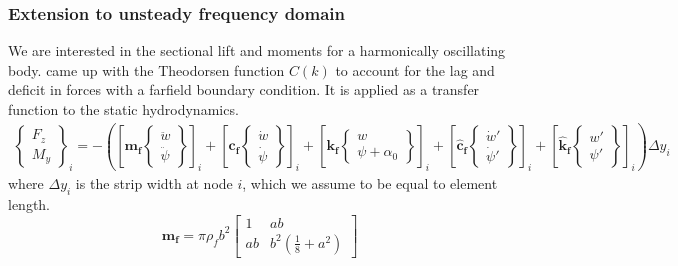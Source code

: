 \documentclass[10pt]{article}
\newcommand{\mbf}[1]{\mathbf{#1}}
\begin{document}
\subsubsection{Extension to unsteady frequency domain}
% 
We are interested in the sectional lift and moments for a harmonically oscillating body.
\citet{Theodorsen:1934} came up with the Theodorsen function $C(k)$ to account for the lag and deficit in forces with a farfield boundary condition.
It is applied as a transfer function to the static hydrodynamics.
\begin{eqnarray}
	\label{eqn:GenFluidTheod}
	\left\{\begin{matrix}
		F_z \\
		M_y
	\end{matrix}\right\}_i =
	-
	\left(
	\left[
		\mbf{m_f}
		\left\{
		\begin{matrix}
			\ddot{w} \\
			\ddot{\psi}
		\end{matrix}
		\right\}
		\right]_i
	+
	\left[
		\mbf{c_f}
		\left\{\begin{matrix}\dot{w} \\ \dot{\psi} \end{matrix}\right\}
		\right]_i
	+
	\left[
		\mbf{k_f}
		\left\{\begin{matrix}w \\ \psi + \alpha_0 \end{matrix}\right\}
		\right]_i
	+
	\left[
		\mbf{\hat{c}_f}
		\left\{\begin{matrix}\dot{w}' \\ \dot{\psi}' \end{matrix}\right\}
		\right]_i
	+
	\left[
		\mbf{\hat{k}_f}
		\left\{\begin{matrix}w' \\ \psi' \end{matrix}\right\}
		\right]_i
	\right)
	\Delta y_i
\end{eqnarray}
where $\Delta y_i$ is the strip width at node $i$, which we assume to be equal to element length.
% 
\begin{equation}
	\label{eqn:FluidMass}
	\mbf{m_f} = \pi \rho_f b^2 \begin{bmatrix}
		1  & ab                                \\
		ab & b^2\left(\frac{1}{8} + a^2\right)
	\end{bmatrix}
\end{equation}
%
\end{document}
